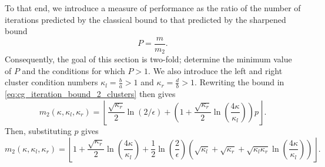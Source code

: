 To that end, we introduce a measure of performance as the ratio of the number of iterations predicted by the classical bound to that predicted by the sharpened bound
\begin{equation}
    P = \frac{m}{m_2}.
    \label{eq:performance_ratio}
\end{equation}
Consequently, the goal of this section is two-fold; determine the minimum value of $P$ and the conditions for which $P > 1$. We also introduce the left and right cluster condition numbers $\kappa_l = \frac{b}{a} > 1$ and $\kappa_r = \frac{d}{b} > 1$. Rewriting the bound in \cref{eq:cg_iteration_bound_2_clusters} then gives
\[
    m_2(\kappa, \kappa_l, \kappa_r)=\left\lfloor\frac{\sqrt{\kappa_r}}{2} \ln (2 / \epsilon)+\left(1+\frac{\sqrt{\kappa_r}}{2} \ln \left(\frac{4\kappa}{\kappa_l}\right)\right) p\right\rfloor.
\]
Then, substituting $p$ gives
\begin{equation}
    m_2(\kappa, \kappa_l, \kappa_r)=\left\lfloor
        1 
        + \frac{\sqrt{\kappa_r}}{2}\ln\left(\frac{4\kappa}{\kappa_l}\right)
        + \frac{1}{2}\ln\left(\frac{2}{\epsilon}\right)\left(
            \sqrt{\kappa_l}
            + \sqrt{\kappa_r}
            + \sqrt{\kappa_l\kappa_r}\ln\left(\frac{4\kappa}{\kappa_l}\right)
        \right)
    \right\rfloor.
    \label{eq:cg_iteration_bound_2_clusters_condition_numbers}
\end{equation} 

